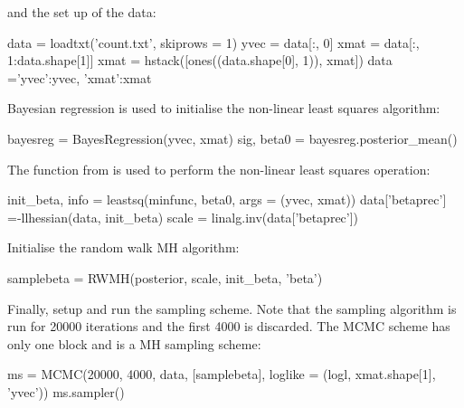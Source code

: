 \documentclass[article]{jss}
\begin{document}
and the set up of the data:
\begin{Code}
data = loadtxt('count.txt', skiprows = 1)
yvec = data[:, 0]
xmat = data[:, 1:data.shape[1]]
xmat = hstack([ones((data.shape[0], 1)), xmat])
data ={'yvec':yvec, 'xmat':xmat} 
\end{Code}

Bayesian regression is used to initialise the non-linear least squares
algorithm:
\begin{Code}
bayesreg = BayesRegression(yvec, xmat)
sig, beta0 = bayesreg.posterior_mean()
\end{Code}

The function  from  is used to perform the
non-linear least squares operation:

\begin{Code}
init_beta, info = leastsq(minfunc, beta0, args = (yvec, xmat))
data['betaprec'] =-llhessian(data, init_beta)
scale = linalg.inv(data['betaprec'])
\end{Code}

Initialise the random walk MH algorithm:
\begin{Code}
samplebeta = RWMH(posterior, scale, init_beta, 'beta')
\end{Code}

Finally, setup and run the sampling scheme.  Note that the sampling
algorithm is run for 20000 iterations and the first 4000 is
discarded. The MCMC scheme has only one block and is a MH sampling
scheme:

\begin{Code}
ms = MCMC(20000, 4000, data, [samplebeta], 
      loglike = (logl, xmat.shape[1], 'yvec'))
ms.sampler()
\end{Code}






\end{document}
